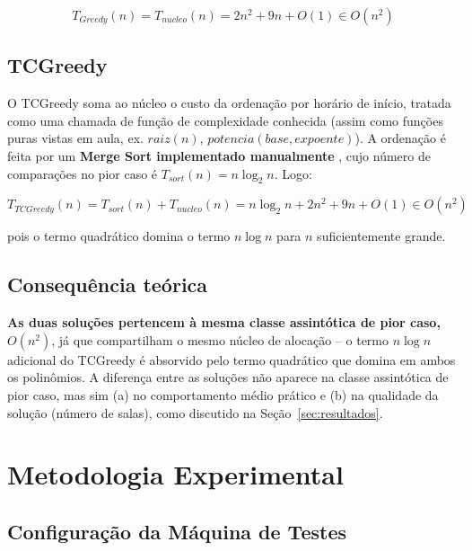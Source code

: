 \documentclass[12pt]{article}
\begin{document}
\begin{equation}
T_{Greedy}(n) = T_{nucleo}(n) = 2n^2 + 9n + O(1) \in O(n^2)
\end{equation}

\subsection{TCGreedy}

O TCGreedy soma ao núcleo o custo da ordenação por horário de início,
tratada como uma chamada de função de complexidade conhecida (assim como
funções puras vistas em aula, ex. $raiz(n)$, $potencia(base,expoente)$).
A ordenação é feita por um \textbf{Merge Sort implementado manualmente}
\cite{brun:ordenacao}, cujo número de comparações no pior caso é
$T_{sort}(n) = n\log_2 n$. Logo:

\begin{equation}
T_{TCGreedy}(n) = T_{sort}(n) + T_{nucleo}(n) = n\log_2 n + 2n^2 + 9n + O(1) \in O(n^2)
\end{equation}

pois o termo quadrático domina o termo $n \log n$ para $n$ suficientemente
grande.

\subsection{Consequência teórica}

\textbf{As duas soluções pertencem à mesma classe assintótica de pior
caso, $O(n^2)$}, já que compartilham o mesmo núcleo de alocação -- o
termo $n \log n$ adicional do TCGreedy é absorvido pelo termo quadrático
que domina em ambos os polinômios. A diferença entre as soluções não
aparece na classe assintótica de pior caso, mas sim (a) no comportamento
médio prático e (b) na qualidade da solução (número de salas), como
discutido na Seção~\ref{sec:resultados}.

\section{Metodologia Experimental}
\label{sec:metodologia}

\subsection{Configuração da Máquina de Testes}
\end{document}
